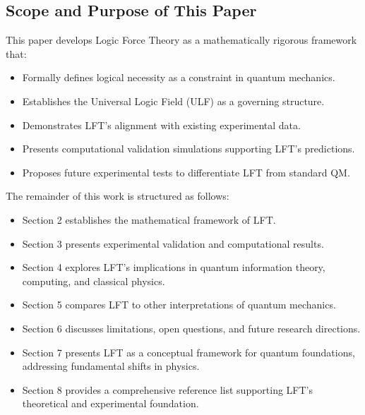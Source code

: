 \subsection{Scope and Purpose of This Paper}
This paper develops Logic Force Theory as a mathematically rigorous framework that:
\begin{itemize}
    \item Formally defines logical necessity as a constraint in quantum mechanics.
    \item Establishes the Universal Logic Field (ULF) as a governing structure.
    \item Demonstrates LFT’s alignment with existing experimental data.
    \item Presents computational validation simulations supporting LFT’s predictions.
    \item Proposes future experimental tests to differentiate LFT from standard QM.
\end{itemize}
The remainder of this work is structured as follows:
\begin{itemize}
    \item Section 2 establishes the mathematical framework of LFT.
    \item Section 3 presents experimental validation and computational results.
    \item Section 4 explores LFT’s implications in quantum information theory, computing, and classical physics.
    \item Section 5 compares LFT to other interpretations of quantum mechanics.
    \item Section 6 discusses limitations, open questions, and future research directions.
    \item Section 7 presents LFT as a conceptual framework for quantum foundations, addressing fundamental shifts in physics.
    \item Section 8 provides a comprehensive reference list supporting LFT’s theoretical and experimental foundation.
\end{itemize}